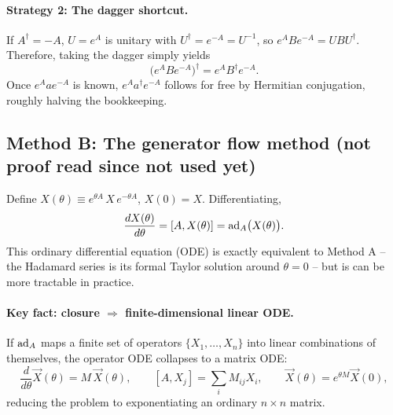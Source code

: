 \documentclass[../main.tex]{subfiles}
\begin{document}
\paragraph{Strategy 2: The dagger shortcut.}
If $A^\dagger=-A$, $U=e^A$ is unitary with $U^\dagger=e^{-A}=U^{-1}$, so
$e^{A}Be^{-A}=UBU^\dagger$. Therefore, taking the dagger simply yields
\begin{equation}
\big(e^{A}Be^{-A}\big)^\dagger = e^{A}B^\dagger e^{-A}.
\end{equation}
Once $e^{A}ae^{-A}$ is known, $e^{A}a^\dagger e^{-A}$ follows for free by Hermitian
conjugation, roughly halving the bookkeeping.

\subsection{Method B: The generator flow method (not proof read since not used yet)}

Define $X(\theta)\equiv e^{\theta A}\,X\,e^{-\theta A}$, $X(0)=X$. Differentiating,
\begin{equation}
\frac{dX(\theta)}{d\theta}=[A,X(\theta)]=\mathrm{ad}_A\big(X(\theta)\big).
\end{equation}
This ordinary differential equation (ODE) is exactly equivalent to Method A -- the Hadamard series is its formal Taylor solution around $\theta=0$ -- but is can be more tractable in practice.

\paragraph{Key fact: closure $\Rightarrow$ finite-dimensional linear ODE.}
If $\mathrm{ad}_A$ maps a finite set of operators $\{X_1,\dots,X_n\}$ into linear combinations
of themselves, the operator ODE collapses to a matrix ODE:
\begin{equation}
\frac{d}{d\theta}\vec X(\theta)=M\,\vec X(\theta),\qquad
[A,X_j]=\sum_iM_{ij}X_i,\qquad \vec X(\theta)=e^{\theta M}\vec X(0),
\end{equation}
reducing the problem to exponentiating an ordinary $n\times n$ matrix.

\end{document}
